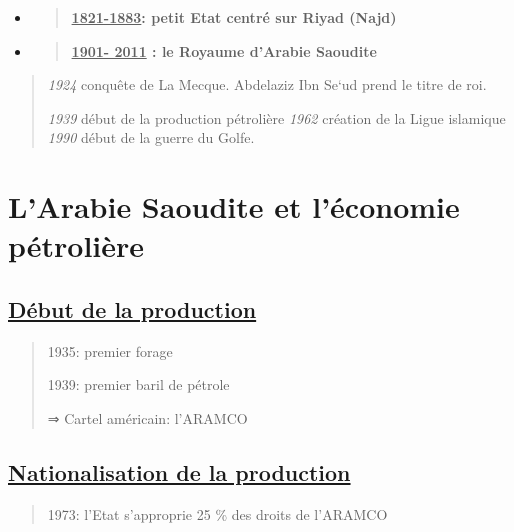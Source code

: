 \begin{itemize}
\item
  \begin{quote}
  \textbf{\underline{1821-1883}: petit Etat centré sur Riyad (Najd)}
  \end{quote}
\item
  \begin{quote}
  \textbf{\underline{1901- 2011} : le Royaume d'Arabie Saoudite}
  \end{quote}
\end{itemize}

\begin{quote}
\emph{1924} conquête de La Mecque. Abdelaziz Ibn Se`ud prend le titre de
roi.

\emph{1939} début de la production pétrolière \emph{1962} création de la
Ligue islamique \emph{1990} début de la guerre du Golfe.
\end{quote}

\hypertarget{larabie-saoudite-et-luxe9conomie-puxe9troliuxe8re}{%
\section{L'Arabie Saoudite et l'économie
pétrolière}\label{larabie-saoudite-et-luxe9conomie-puxe9troliuxe8re}}

\hypertarget{duxe9but-de-la-production}{%
\subsection{\texorpdfstring{\underline{Début de la
production}}{Début de la production}}\label{duxe9but-de-la-production}}

\begin{quote}
1935: premier forage

1939: premier baril de pétrole

⇒ Cartel américain: l'ARAMCO
\end{quote}

\hypertarget{nationalisation-de-la-production}{%
\subsection{\texorpdfstring{\underline{Nationalisation de la
production}}{Nationalisation de la production}}\label{nationalisation-de-la-production}}

\begin{quote}
1973: l'Etat s'approprie 25 \% des droits de l'ARAMCO
\end{quote}

